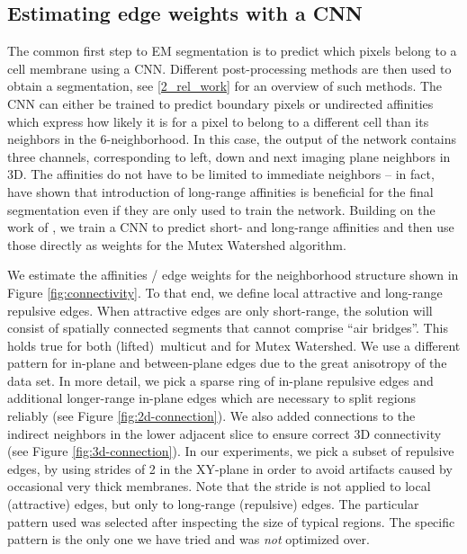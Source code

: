 \subsection{Estimating edge weights with a CNN} \label{4_cnn}
The common first step to EM segmentation is to predict which pixels belong to a cell membrane using a CNN. Different post-processing methods are then used to obtain a segmentation, see \autoref{2_rel_work} for an overview of such methods.
The CNN can either be trained to predict boundary pixels \cite{ciresan_12_deep-em-segmentation,beier2017multicut} or undirected affinities \cite{lee2017superhuman,funke2018large} which express how likely it is for a pixel to belong to a different cell than its neighbors in the 6-neighborhood. In this case, the output of the network contains three channels, corresponding to left, down and next imaging plane neighbors in 3D. The affinities do not  have to be limited to immediate neighbors -- in fact, \cite{lee2017superhuman} have shown that introduction of long-range affinities is beneficial for the final segmentation even if they are only used to train the network. Building on the work of \cite{lee2017superhuman}, we train a CNN to predict short- and long-range affinities and then use those directly as weights for the Mutex Watershed algorithm. 

We estimate the affinities / edge weights for the neighborhood structure shown in Figure \ref{fig:connectivity}. To that end, we define local attractive and long-range repulsive edges. When attractive edges are only short-range, the solution will consist of spatially connected segments that cannot comprise ``air bridges''. This holds true for both (lifted)~multicut and for Mutex Watershed. We use a different pattern for in-plane and between-plane edges due to the great anisotropy of the data set. In more detail, we pick a sparse ring of in-plane repulsive edges and additional longer-range in-plane edges which are necessary to split regions reliably (see Figure \ref{fig:2d-connection}).
We also added connections to the indirect neighbors in the lower adjacent slice to ensure correct 3D connectivity (see Figure \ref{fig:3d-connection}). In our experiments, we pick a subset of repulsive edges, by using strides of 2 in the XY-plane in order to avoid artifacts caused by occasional very thick membranes. Note that the stride is not applied to local (attractive) edges, but only to long-range (repulsive) edges. The particular pattern used was selected after inspecting the size of typical regions. The specific pattern is the only one we have tried and was {\it not} optimized over.

